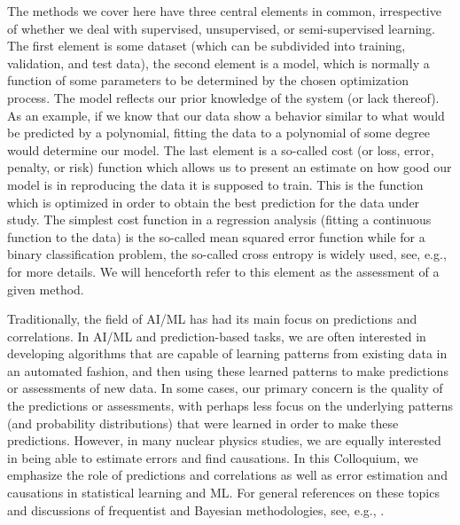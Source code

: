 \documentclass[aps,rmp,reprint,amsmath,amssymb,graphicx,longbibliography]{revtex4-2}
\begin{document}
The methods we cover here have three central elements in common,
irrespective of whether we deal with supervised, unsupervised, or
semi-supervised learning. The first element is some dataset (which can
be subdivided into training, validation, and test data), the second
element is a model, which is normally a function of some parameters to
be determined by the chosen optimization process. The model reflects
our prior knowledge of the system (or lack thereof). As an example, if
we know that our data show a behavior similar to what would be
predicted by a polynomial, fitting the data to a polynomial of some
degree would determine our model.  The last element is a so-called
cost (or loss, error, penalty, or risk) function which allows us to
present an estimate on how good our model is in reproducing the data
it is supposed to train. This is the function which is optimized in
order to obtain the best prediction for the data under study. The
simplest cost function in a regression analysis (fitting a continuous
function to the data) is the so-called mean squared error function
while for a binary classification problem, the so-called cross entropy
is widely used, see, e.g., \cite{Murphy2012,Bishop2006,Hastie2009} for
more details. We will henceforth refer to this element as the
assessment of a given method.


 
Traditionally, the field of AI/ML has had its main focus on
predictions and correlations.  In AI/ML and prediction-based tasks, we
are often interested in developing algorithms that are capable of
learning patterns from existing data in an automated fashion, and then
using these learned patterns to make predictions or assessments of new
data. In some cases, our primary concern is the quality of the
predictions or assessments, with perhaps less focus on the underlying
patterns (and probability distributions) that were learned in order to
make these predictions.  However, in many nuclear physics studies, we
are equally interested in being able to estimate errors and find
causations.  In this Colloquium, we emphasize the role of predictions
and correlations as well as error estimation and causations in
statistical learning and ML.  For general references on these topics
and discussions of frequentist and Bayesian methodologies, see, e.g.,
\cite{Bishop2006, Goodfellow2016, Murphy2012, Hastie2009}.


\end{document}
